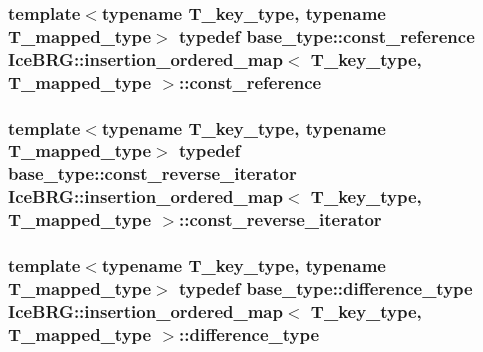 \subsubsection[{const\+\_\+reference}]{\setlength{\rightskip}{0pt plus 5cm}template$<$typename T\+\_\+key\+\_\+type, typename T\+\_\+mapped\+\_\+type$>$ typedef base\+\_\+type\+::const\+\_\+reference {\bf Ice\+B\+R\+G\+::insertion\+\_\+ordered\+\_\+map}$<$ T\+\_\+key\+\_\+type, T\+\_\+mapped\+\_\+type $>$\+::{\bf const\+\_\+reference}}\label{classIceBRG_1_1insertion__ordered__map_a31d0718377868da407efc5e3c099bb72}
\hypertarget{classIceBRG_1_1insertion__ordered__map_a6ea4c81c64ddc62cc283edcf681d892e}{}
\subsubsection[{const\+\_\+reverse\+\_\+iterator}]{\setlength{\rightskip}{0pt plus 5cm}template$<$typename T\+\_\+key\+\_\+type, typename T\+\_\+mapped\+\_\+type$>$ typedef base\+\_\+type\+::const\+\_\+reverse\+\_\+iterator {\bf Ice\+B\+R\+G\+::insertion\+\_\+ordered\+\_\+map}$<$ T\+\_\+key\+\_\+type, T\+\_\+mapped\+\_\+type $>$\+::{\bf const\+\_\+reverse\+\_\+iterator}}\label{classIceBRG_1_1insertion__ordered__map_a6ea4c81c64ddc62cc283edcf681d892e}
\hypertarget{classIceBRG_1_1insertion__ordered__map_acf3d07daab9a17d295825ba88e86f9b6}{}
\subsubsection[{difference\+\_\+type}]{\setlength{\rightskip}{0pt plus 5cm}template$<$typename T\+\_\+key\+\_\+type, typename T\+\_\+mapped\+\_\+type$>$ typedef base\+\_\+type\+::difference\+\_\+type {\bf Ice\+B\+R\+G\+::insertion\+\_\+ordered\+\_\+map}$<$ T\+\_\+key\+\_\+type, T\+\_\+mapped\+\_\+type $>$\+::{\bf difference\+\_\+type}}\label{classIceBRG_1_1insertion__ordered__map_acf3d07daab9a17d295825ba88e86f9b6}
\hypertarget{classIceBRG_1_1insertion__ordered__map_ac41b1e73bdb41c7b45da36e8eca7fb70}{}
